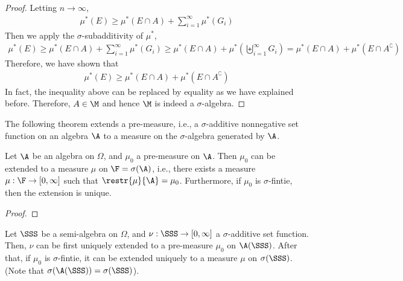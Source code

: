 \documentclass[thmcnt=section, 12pt]{elegantbook}
\begin{document}
\begin{proof}
    Letting $ n \to \infty $, 
    \begin{align*}
        \mu^\ast(E) \geq \mu^\ast(E \cap A) + \sum_{i=1}^\infty {\mu^\ast(G_i)}
    \end{align*}
    Then we apply the $ \sigma $-subadditivity of $ \mu^\ast $,
    \begin{align*}
        \mu^\ast(E) \geq \mu^\ast(E \cap A) + \sum_{i=1}^\infty {\mu^\ast(G_i)} \geq \mu^\ast(E \cap A) + \mu^\ast\left(\biguplus_{i=1}^\infty {G_i}\right) = \mu^\ast(E \cap A) + \mu^\ast(E \cap A^\complement)
    \end{align*}
    Therefore, we have shown that 
    \begin{align*}
        \mu^\ast(E) \geq \mu^\ast(E \cap A) + \mu^\ast(E \cap A^\complement)
    \end{align*}
    In fact, the inequality above can be replaced by equality as we have explained before. Therefore, $ A \in \M $ and hence $ \M $ is indeed a $ \sigma $-algebra.
\end{proof}


\par The following theorem extends a pre-measure, i.e., a $\sigma$-additive nonnegative set function on an algebra $\A$ to a measure on the $\sigma$-algebra generated by $\A$.

\begin{theorem} \label{thm:2}
    Let $\A$ be an algebra on $\Omega$, and $\mu_0$ a pre-measure on $\A$. Then $\mu_0$ can be extended to a measure $\mu$ on $\F = \sigma(\A)$, i.e., there exists a measure $\mu: \F \to [0, \infty]$ such that $\restr{\mu}{\A} = \mu_0$. Furthermore, if $\mu_0$ is $\sigma$-fintie, then the extension is unique.
\end{theorem}

\begin{proof}
\end{proof}


\begin{theorem} \label{thm:3}
    Let $\SSS$ be a semi-algebra on $\Omega$, and $\nu: \SSS \to [0, \infty]$ a $\sigma$-additive set function. Then, $\nu$ can be first uniquely extended to a pre-measure $\mu_0$ on $\A(\SSS)$. After that, if $\mu_0$ is $\sigma$-fintie, it can be extended uniquely to a measure $\mu$ on $\sigma(\SSS)$. (Note that $\sigma(\A(\SSS)) = \sigma(\SSS)$).
\end{theorem}
\end{document}
